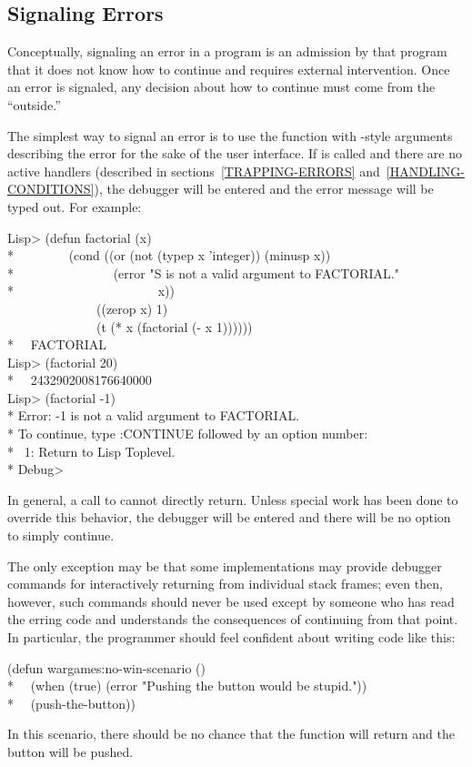 \subsection{Signaling Errors}

Conceptually, signaling an error in a program is an admission by that program
that it does not know how to continue and requires external intervention. Once
an error is signaled, any decision about how to continue must come from the
``outside.''

The simplest way to signal an error is to use the  function with
-style arguments describing the error for the sake of the user interface.
If  is called and there are no active handlers (described
in sections~\ref{TRAPPING-ERRORS} and~\ref{HANDLING-CONDITIONS}), the
debugger will be entered and the error message will be typed out. For example:
\begin{lisp}
Lisp> (defun factorial (x) \\*
~~~~~~~~(cond ((or (not (typep x 'integer)) (minusp x)) \\*
~~~~~~~~~~~~~~~(error "{\Xtilde}S is not a valid argument to FACTORIAL." \\*
~~~~~~~~~~~~~~~~~~~~~~x)) \\
~~~~~~~~~~~~~~((zerop x) 1) \\
~~~~~~~~~~~~~~(t (* x (factorial (- x 1)))))) \\*
~\EV\ FACTORIAL \\
Lisp> (factorial 20) \\*
~\EV\ 2432902008176640000 \\
Lisp> (factorial -1) \\*
Error: -1 is not a valid argument to FACTORIAL. \\*
To continue, type :CONTINUE followed by an option number: \\*
~1: Return to Lisp Toplevel. \\*
Debug> 
\end{lisp}
In general, a call to  cannot directly return. Unless special work has
been done to override this behavior, the debugger will be entered and there
will be no option to simply continue.

The only exception may be that some implementations may provide debugger
commands for interactively returning from individual stack frames; even then,
however, such commands should never be used except by someone who has read the
erring code and understands the consequences of continuing from that point. In
particular, the programmer should feel confident
about writing code like this:
\begin{lisp}
(defun wargames:no-win-scenario () \\*
~~(when (true) (error "Pushing the button would be stupid.")) \\*
~~(push-the-button))
\end{lisp}
In this scenario, there should be no chance that the function  will return
and the button will be pushed.

